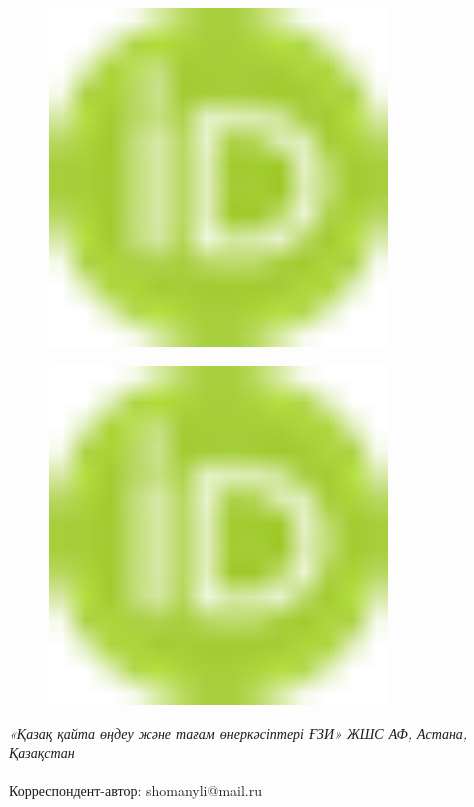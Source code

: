 {\begin{figure}[H]
	\centering
	\includegraphics[width=0.8\textwidth]{media/pish3/image1}
	\caption*{}
\end{figure}

\begin{figure}[H]
	\centering
	\includegraphics[width=0.8\textwidth]{media/pish3/image1}
	\caption*{}
\end{figure}


\emph{«Қазақ қайта өңдеу және тағам өнеркәсіптері ҒЗИ» ЖШС АФ, Астана,
Қазақстан}

{\bfseries \textsuperscript{\envelope }}Корреспондент-автор: shomanyli@mail.ru

}
